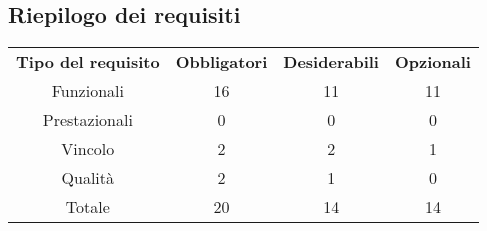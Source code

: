\subsection{Riepilogo dei requisiti}
\begin{table}[h]
\centering
\begin{tabular}{| c | c | c | c |}
		\rowcolor{LightBlue}
		\color{white}\bfseries Tipo del requisito & \color{white}\bfseries Obbligatori & \color{white}\bfseries Desiderabili & \color{white}\bfseries Opzionali \\[0.25cm]
		 Funzionali & 16 & 11 & 11 \\
		 Prestazionali & 0 & 0 & 0 \\
		 Vincolo & 2 & 2 & 1 \\
		 Qualità & 2 & 1 & 0 \\
		 Totale & 20 & 14 & 14 \\ \hline
\end{tabular}
\end{table}